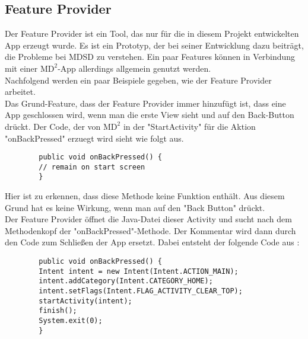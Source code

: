 \documentclass[a4paper,twoside]{article}
\begin{document}
	\subsection{Feature Provider}
	Der Feature Provider ist ein Tool, das nur f\"ur die in diesem Projekt entwickelten App erzeugt wurde. Es ist ein Prototyp, der bei seiner Entwicklung dazu beitr\"agt, die Probleme bei MDSD zu verstehen. Ein paar Features k\"onnen in Verbindung mit einer $\text{MD}^2$-App allerdings allgemein genutzt werden.\\
	Nachfolgend werden ein paar Beispiele gegeben, wie der Feature Provider arbeitet.\\
	Das Grund-Feature, dass der Feature Provider immer hinzuf\"ugt ist, dass eine App geschlossen wird, wenn man die erste View sieht und auf den Back-Button dr\"uckt. Der Code, der von $\text{MD}^2$ in der "StartActivity" f\"ur die Aktion "onBackPressed" erzuegt wird sieht wie folgt aus.
	
	\begin{small}
		\begin{verbatim}
		public void onBackPressed() {
		// remain on start screen
		}
		\end{verbatim}
	\end{small}
	
	\noindent Hier ist zu erkennen, dass diese Methode keine Funktion enth\"alt. Aus diesem Grund hat es keine Wirkung, wenn man auf den "Back Button" dr\"uckt.\\
	Der Feature Provider \"offnet die Java-Datei dieser Activity und sucht nach dem Methodenkopf der "onBackPressed"-Methode. Der Kommentar wird dann durch den Code zum Schlie\ss{}en der App ersetzt. Dabei entsteht der folgende Code aus \cite{backclose}:
	
	\begin{small}
		\begin{verbatim}
		public void onBackPressed() {
		Intent intent = new Intent(Intent.ACTION_MAIN);
		intent.addCategory(Intent.CATEGORY_HOME);
		intent.setFlags(Intent.FLAG_ACTIVITY_CLEAR_TOP);
		startActivity(intent);
		finish();
		System.exit(0);
		}
		\end{verbatim}
	\end{small}
	
\end{document}
